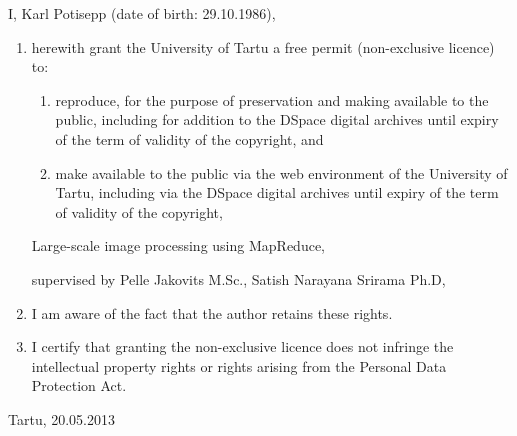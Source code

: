 \documentclass [12pt,a4paper]{report}
\begin{document}
I, Karl Potisepp (date of birth: 29.10.1986),

\begin{enumerate}
\item herewith grant the University of Tartu a free permit (non-exclusive licence) to:

\begin{enumerate}
\item reproduce, for the purpose of preservation and making available to the public, including for addition to the DSpace digital archives until expiry of the term of validity of the copyright, and

\item make available to the public via the web environment of the University of Tartu, including via the DSpace digital archives until expiry of the term of validity of the copyright,
\end{enumerate}

\begin{center}
Large-scale image processing using MapReduce,
\end{center}

supervised by Pelle Jakovits M.Sc., Satish Narayana Srirama Ph.D,

\item I am aware of the fact that the author retains these rights.

\item I certify that granting the non-exclusive licence does not infringe the intellectual property rights or rights arising from the Personal Data Protection Act. 
\end{enumerate}



Tartu, 20.05.2013


\clearpage
{}


\end{document}
